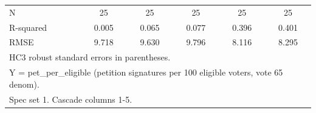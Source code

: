 \begin{table}[htbp]
\begin{tabular}{l*{5}{c}}
\midrule
N           &          25   &          25   &          25   &          25   &          25   \\
R-squared   &       0.005   &       0.065   &       0.077   &       0.396   &       0.401   \\
RMSE        &       9.718   &       9.630   &       9.796   &       8.116   &       8.295   \\
\bottomrule
\multicolumn{6}{l}{\footnotesize HC3 robust standard errors in parentheses.}\\
\multicolumn{6}{l}{\footnotesize Y = pet\_per\_eligible (petition signatures per 100 eligible voters, vote 65 denom).}\\
\multicolumn{6}{l}{\footnotesize Spec set 1. Cascade columns 1-5.}\\
\end{tabular}
\end{table}
